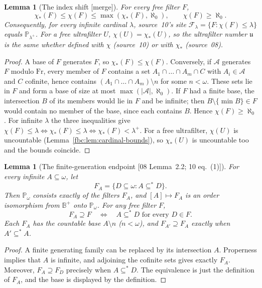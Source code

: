 \documentclass[11pt,letterpaper]{article}
\newtheorem{lemma}[theorem]{Lemma}
\theoremstyle{definition}
\theoremstyle{remark}
\newcommand{\om}{\omega}
\newcommand{\Fr}{\mathrm{Fr}}
\newcommand{\B}{\mathbb B}
\newcommand{\PP}{\mathbb P}
\newcommand{\cu}{\mathfrak u}
\newcommand{\src}[1]{\textup{[#1]}}
\begin{document}
\begin{lemma}[The index shift \src{merge}]
\label{fbc:lem:index-shift}
For every free filter $F$,
\[
 \chi_*(F)\leq\chi(F)\leq\max(\chi_*(F),\aleph_0),
 \qquad \chi(F)\geq\aleph_0.
\]
Consequently, for every infinite cardinal $\lambda$, source~10's site
$\mathcal F_\lambda=\{F:\chi(F)\leq\lambda\}$ equals $\PP_{\lambda^+}$.
For a free ultrafilter $U$, $\chi(U)=\chi_*(U)$, so the ultrafilter
number $\cu$ is the same whether defined with $\chi$ (source~10) or with
$\chi_*$ (source~08).
\end{lemma}
\begin{proof}
A base of $F$ generates $F$, so $\chi_*(F)\leq\chi(F)$. Conversely, if
$\mathcal A$ generates $F$ modulo $\Fr$, every member of $F$ contains a
set $A_1\cap\dots\cap A_m\cap C$ with $A_i\in\mathcal A$ and $C$
cofinite, hence contains $(A_1\cap\dots\cap A_m)\setminus n$ for some
$n<\om$. These sets lie in $F$ and form a base of size at most
$\max(|\mathcal A|,\aleph_0)$. If $F$ had a finite base, the intersection
$B$ of its members would lie in $F$ and be infinite; then
$B\setminus\{\min B\}\in F$ would contain no member of the base, since
each contains $B$. Hence $\chi(F)\geq\aleph_0$. For infinite $\lambda$
the three inequalities give $\chi(F)\leq\lambda\iff\chi_*(F)\leq\lambda
\iff\chi_*(F)<\lambda^+$. For a free ultrafilter, $\chi(U)$ is
uncountable (Lemma~\ref{fbc:lem:cardinal-bounds}), so
$\chi_*(U)$ is uncountable too and the bounds coincide.
\end{proof}

\begin{lemma}[The finite-generation endpoint \src{08 Lemma~2.2; 10 eq.~(1)}]
\label{fbc:lem:principal}
For every infinite $A\subseteq\om$, let
\[
 F_A=\{D\subseteq\om:A\subseteq^*D\}.
\]
Then $\PP_\om$ consists exactly of the filters $F_A$, and
$[A]\mapsto F_A$ is an order isomorphism from $\B^+$ onto
$\PP_\om$. For any free filter $F$,
\[
 F_A\supseteq F\quad\Longleftrightarrow\quad
 A\subseteq^*D\text{ for every }D\in F.
\]
Each $F_A$ has the countable base $A\setminus n$ ($n<\om$), and
$F_{A'}\supseteq F_A$ exactly when $A'\subseteq^*A$.
\end{lemma}
\begin{proof}
A finite generating family can be replaced by its intersection $A$.
Properness implies that $A$ is infinite, and adjoining the cofinite
sets gives exactly $F_A$. Moreover, $F_A\supseteq F_D$ precisely when
$A\subseteq^*D$. The equivalence is just the definition of $F_A$, and
the base is displayed by the definition.
\end{proof}
\end{document}
